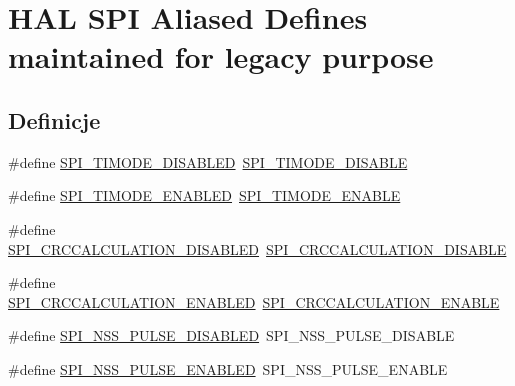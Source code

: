 \hypertarget{group___h_a_l___s_p_i___aliased___defines}{}\section{H\+AL S\+PI Aliased Defines maintained for legacy purpose}
\label{group___h_a_l___s_p_i___aliased___defines}
\subsection*{Definicje}
\begin{DoxyCompactItemize}
\item 
\#define \hyperlink{group___h_a_l___s_p_i___aliased___defines_ga609b88c83bda8bbb4ba9a7f673c034a2}{S\+P\+I\+\_\+\+T\+I\+M\+O\+D\+E\+\_\+\+D\+I\+S\+A\+B\+L\+ED}~\hyperlink{group___s_p_i___t_i__mode_gaffbf066ee656a4d56b75fa721a2eabcd}{S\+P\+I\+\_\+\+T\+I\+M\+O\+D\+E\+\_\+\+D\+I\+S\+A\+B\+LE}
\item 
\#define \hyperlink{group___h_a_l___s_p_i___aliased___defines_ga18e6aa4b66deab2bb37a7ada4f9e89ee}{S\+P\+I\+\_\+\+T\+I\+M\+O\+D\+E\+\_\+\+E\+N\+A\+B\+L\+ED}~\hyperlink{group___s_p_i___t_i__mode_ga8b31d4b25f951edd1dfd7cf6d4387517}{S\+P\+I\+\_\+\+T\+I\+M\+O\+D\+E\+\_\+\+E\+N\+A\+B\+LE}
\item 
\#define \hyperlink{group___h_a_l___s_p_i___aliased___defines_ga8b6d5ee09247d44354bf099a44a8e00c}{S\+P\+I\+\_\+\+C\+R\+C\+C\+A\+L\+C\+U\+L\+A\+T\+I\+O\+N\+\_\+\+D\+I\+S\+A\+B\+L\+ED}~\hyperlink{group___s_p_i___c_r_c___calculation_ga9cd586b66473d7f207103a443280820e}{S\+P\+I\+\_\+\+C\+R\+C\+C\+A\+L\+C\+U\+L\+A\+T\+I\+O\+N\+\_\+\+D\+I\+S\+A\+B\+LE}
\item 
\#define \hyperlink{group___h_a_l___s_p_i___aliased___defines_gae5a75572823d5dd97c6d1117902c47a1}{S\+P\+I\+\_\+\+C\+R\+C\+C\+A\+L\+C\+U\+L\+A\+T\+I\+O\+N\+\_\+\+E\+N\+A\+B\+L\+ED}~\hyperlink{group___s_p_i___c_r_c___calculation_ga431d368997c9c41e8923cbcd41b00123}{S\+P\+I\+\_\+\+C\+R\+C\+C\+A\+L\+C\+U\+L\+A\+T\+I\+O\+N\+\_\+\+E\+N\+A\+B\+LE}
\item 
\#define \hyperlink{group___h_a_l___s_p_i___aliased___defines_ga7b740c1df3416560df8ced2a55c0e65c}{S\+P\+I\+\_\+\+N\+S\+S\+\_\+\+P\+U\+L\+S\+E\+\_\+\+D\+I\+S\+A\+B\+L\+ED}~S\+P\+I\+\_\+\+N\+S\+S\+\_\+\+P\+U\+L\+S\+E\+\_\+\+D\+I\+S\+A\+B\+LE
\item 
\#define \hyperlink{group___h_a_l___s_p_i___aliased___defines_gafde578b0ee1d235743693a73045abc14}{S\+P\+I\+\_\+\+N\+S\+S\+\_\+\+P\+U\+L\+S\+E\+\_\+\+E\+N\+A\+B\+L\+ED}~S\+P\+I\+\_\+\+N\+S\+S\+\_\+\+P\+U\+L\+S\+E\+\_\+\+E\+N\+A\+B\+LE
\end{DoxyCompactItemize}


